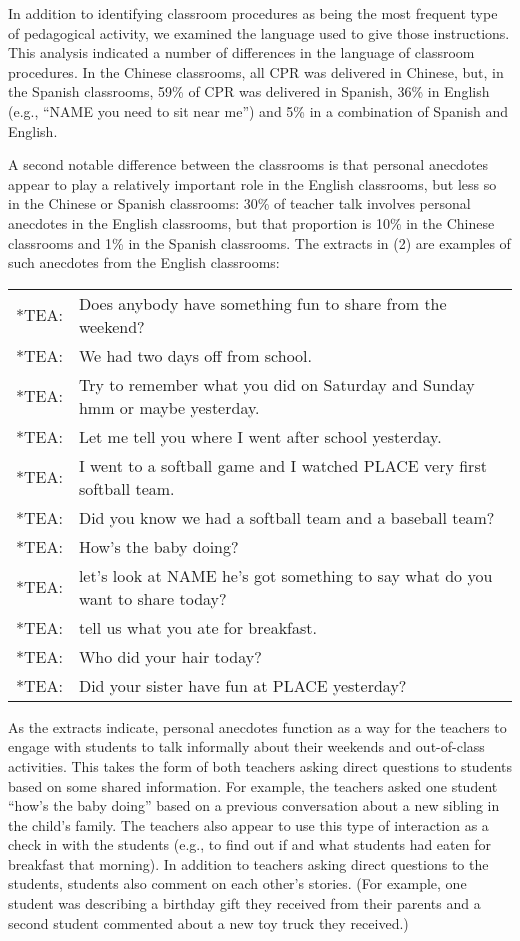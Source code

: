 \documentclass[output=paper,chinesefont]{langscibook}
\begin{document}
In addition to identifying classroom procedures as being the most frequent type of pedagogical activity, we examined the language used to give those instructions. This analysis indicated a number of differences in the language of classroom procedures. In the Chinese classrooms, all CPR was delivered in Chinese, but, in the Spanish classrooms, 59\% of CPR was delivered in Spanish, 36\% in English (e.g., ``NAME you need to sit near me'') and 5\% in a combination of Spanish and English.


A second notable difference between the classrooms is that personal anecdotes appear to play a relatively important role in the English classrooms, but less so in the Chinese or Spanish classrooms: 30\% of teacher talk involves personal anecdotes in the English classrooms, but that proportion is 10\% in the Chinese classrooms and 1\% in the Spanish classrooms. The extracts in (2) are examples of such anecdotes from the English classrooms:

\ea
\begin{tabularx}{\linewidth}[t]{@{}lQ@{}}
*TEA: & Does anybody have something fun to share from the weekend?\\
*TEA: & We had two days off from school.\\
*TEA: & Try to remember what you did on Saturday and Sunday hmm or maybe yesterday.\\
*TEA: & Let me tell you where I went after school yesterday.\\
*TEA: & I went to a softball game and I watched PLACE very first softball team.\\
*TEA: & Did you know we had a softball team and a baseball team?\\
*TEA: & How's the baby doing?\\
*TEA: & let's look at NAME he's got something to say what do you want to share today?\\
*TEA: & tell us what you ate for breakfast.\\
*TEA: & Who did your hair today?\\
*TEA: & Did your sister have fun at PLACE yesterday?\\
\end{tabularx}
\z

As the extracts indicate, personal anecdotes function as a way for the teachers to engage with students to talk informally about their weekends and out-of-class activities. This takes the form of both teachers asking direct questions to students based on some shared information. For example, the teachers asked one student ``how’s the baby doing'' based on a previous conversation about a new sibling in the child’s family. The teachers also appear to use this type of interaction as a check in with the students (e.g., to find out if and what students had eaten for breakfast that morning). In addition to teachers asking direct questions to the students, students also comment on each other's stories. (For example, one student was describing a birthday gift they received from their parents and a second student commented about a new toy truck they received.) 
\end{document}
